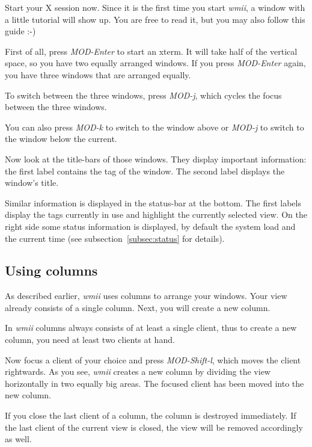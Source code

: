 \documentclass[12pt,a4paper]{article} %
\newcommand{\wmii}{\emph{wmii}}
\begin{document}
    Start your X session now. Since it is the first time you
    start \wmii, a window with a little tutorial will show up. You are
    free to read it, but you may also follow this guide :-)

    First of all, press \emph{MOD-Enter} to start an xterm. It will
    take half of the vertical space, so you have two equally arranged
    windows. If you press \emph{MOD-Enter} again, you have three
    windows that are arranged equally.

    To switch between the three windows, press
    \emph{MOD-j}, which cycles the focus between the three windows.

    You can also press \emph{MOD-k} to switch to the window above or
    \emph{MOD-j} to switch to the window below the current.

    Now look at the title-bars of those windows. They display 
    important information: the first label contains the tag of
    the window. The second label displays the window's title.

    Similar information is displayed in the status-bar at the bottom.  The
    first labels display the tags currently in use and highlight the currently
    selected view. On the right side some status information is displayed, by
    default the system load and the current time (see
    subsection~\ref{subsec:status} for details).

    \subsection{Using columns}

    As described earlier, \wmii{} uses columns to arrange your windows.
    Your view already consists of a single column.
    Next, you will create a new column.

    In \wmii{} columns always consists of at least a single client,
    thus to create a new column, you need at least two clients at hand.

    Now focus a client of your choice and press \emph{MOD-Shift-l},
    which moves the client rightwards. As you see, \wmii{} creates
    a new column by dividing the view horizontally in two equally big
    areas. The focused client has been moved into the new column.

    If you close the last client of a column, the column is destroyed
    immediately. If the last client of the current view is closed,
    the view will be removed accordingly as well.
\end{document}
